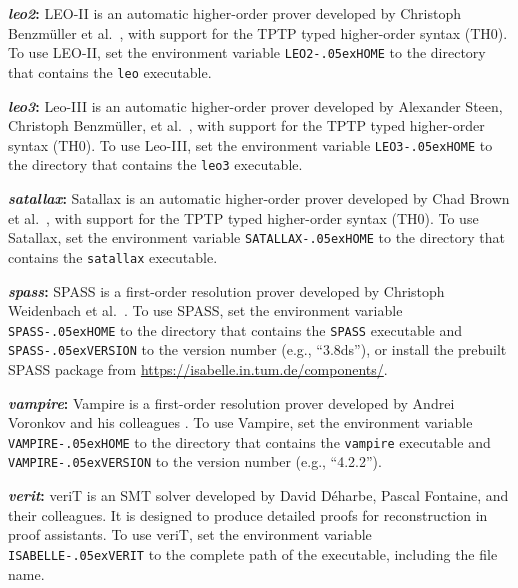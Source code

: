 \documentclass[a4paper,12pt]{article}
\newcommand\download{\url{https://isabelle.in.tum.de/components/}}
\renewcommand\_{\hbox{\textunderscore\kern-.05ex}}
\begin{document}
\begin{enum}
\begin{sloppy}
\begin{enum}
\item[\labelitemi] \textbf{\textit{leo2}:} LEO-II is an automatic
higher-order prover developed by Christoph Benzm\"uller et al.\ \cite{leo2},
with support for the TPTP typed higher-order syntax (TH0). To use LEO-II, set
the environment variable \texttt{LEO2\_HOME} to the directory that contains the
\texttt{leo} executable.

\item[\labelitemi] \textbf{\textit{leo3}:} Leo-III is an automatic
higher-order prover developed by Alexander Steen, Christoph Benzm\"uller,
et al.\ \cite{leo3},
with support for the TPTP typed higher-order syntax (TH0). To use Leo-III, set
the environment variable \texttt{LEO3\_HOME} to the directory that contains the
\texttt{leo3} executable.

\item[\labelitemi] \textbf{\textit{satallax}:} Satallax is an automatic
higher-order prover developed by Chad Brown et al.\ \cite{satallax}, with
support for the TPTP typed higher-order syntax (TH0). To use Satallax, set the
environment variable \texttt{SATALLAX\_HOME} to the directory that contains the
\texttt{satallax} executable.

\item[\labelitemi] \textbf{\textit{spass}:} SPASS is a first-order resolution
prover developed by Christoph Weidenbach et al.\ \cite{weidenbach-et-al-2009}.
To use SPASS, set the environment variable \texttt{SPASS\_HOME} to the directory
that contains the \texttt{SPASS} executable and \texttt{SPASS\_VERSION} to the
version number (e.g., ``3.8ds''), or install the prebuilt SPASS package from
\download.

\item[\labelitemi] \textbf{\textit{vampire}:} Vampire is a first-order
resolution prover developed by Andrei Voronkov and his colleagues
\cite{riazanov-voronkov-2002}. To use Vampire, set the environment variable
\texttt{VAMPIRE\_HOME} to the directory that contains the \texttt{vampire}
executable and \texttt{VAMPIRE\_VERSION} to the version number (e.g.,
``4.2.2'').

\item[\labelitemi] \textbf{\textit{verit}:} veriT \cite{bouton-et-al-2009} is an
SMT solver developed by David D\'eharbe, Pascal Fontaine, and their colleagues.
It is designed to produce detailed proofs for reconstruction in proof
assistants. To use veriT, set the environment variable \texttt{ISABELLE\_VERIT}
to the complete path of the executable, including the file name.


\end{enum}
\end{sloppy}
\end{enum}
\end{document}
